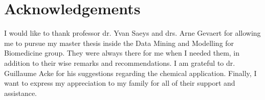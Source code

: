 \chapter{Acknowledgements}

I would like to thank professor dr. Yvan Saeys and drs. Arne Gevaert for allowing me 
to pursue my master thesis inside the Data Mining and Modelling for Biomedicine group. 
They were always there for me when I needed them, in addition to their wise remarks and 
recommendations. I am grateful to dr. Guillaume Acke for his suggestions regarding the chemical 
application. Finally, I want to express my appreciation to my family for all of their 
support and assistance.

